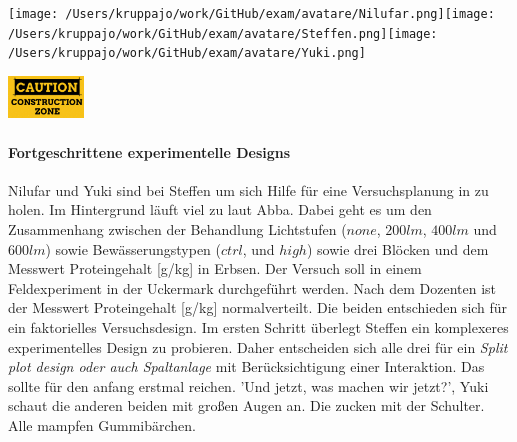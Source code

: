 \documentclass[a4paper, 9pt]{scrartcl}\usepackage[]{graphicx}\usepackage[]{xcolor}
\begin{document}
 
\ifcollection
\begin{flushright}
\tiny\vspace{-3Ex}
\textbf{\examinhaltstart}
\exammodulebiostat
\vspace{-4Ex}
\end{flushright}
\begin{minipage}[t]{0.5\textwidth}
\texttt{[image: /Users/kruppajo/work/GitHub/exam/avatare/Nilufar.png]}\hspace{-4mm}\texttt{[image: /Users/kruppajo/work/GitHub/exam/avatare/Steffen.png]}\hspace{-4mm}\texttt{[image: /Users/kruppajo/work/GitHub/exam/avatare/Yuki.png]}
\end{minipage}
\begin{minipage}[t]{0.5\textwidth}
\hfill
\href{https://youtu.be/wJqsNV1hOW8}{\includegraphics[width = 2cm]{img/caution}}
\end{minipage}
\fi



\ifcollection
\paragraph{Fortgeschrittene experimentelle Designs}
\fi

Nilufar und Yuki sind bei Steffen um sich Hilfe für eine Versuchsplanung in \Rlogo zu holen. Im Hintergrund läuft viel zu laut Abba. Dabei geht es um den Zusammenhang zwischen der Behandlung Lichtstufen ($none$, $200lm$, $400lm$ und $600lm$) sowie Bewässerungstypen ($ctrl$, und $high$) sowie drei Blöcken und dem Messwert Proteingehalt [g/kg] in Erbsen. Der Versuch soll in einem Feldexperiment in der Uckermark durchgeführt werden. Nach dem Dozenten ist der Messwert Proteingehalt [g/kg] normalverteilt. Die beiden entschieden sich für ein faktorielles Versuchsdesign. Im ersten Schritt überlegt Steffen ein komplexeres experimentelles Design zu probieren. Daher entscheiden sich alle drei für ein \textit{Split plot design oder auch Spaltanlage} mit Berücksichtigung einer Interaktion. Das sollte für den anfang erstmal reichen. 'Und jetzt, was machen wir jetzt?', Yuki schaut die anderen beiden mit großen Augen an. Die zucken mit der Schulter. Alle mampfen Gummibärchen.\\
\end{document}
